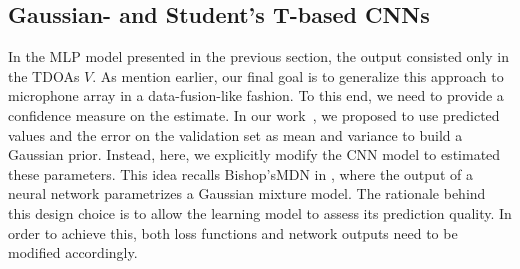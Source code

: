 \subsection{Gaussian- and Student's T-based CNNs}
In the \ac{MLP} model presented in the previous section, the output consisted only in the \acp{TDOA} $V$.
As mention earlier, our final goal is to generalize this approach to microphone array in a data-fusion-like fashion.
To this end, we need to provide a confidence measure on the estimate.
In our work~, we proposed to use predicted values and the error on the validation set as mean and variance to build a Gaussian prior.
Instead, here, we explicitly modify the \ac{CNN} model to estimated these parameters.
This idea recalls Bishop's\ac{MDN} in , where the output of a neural network parametrizes a Gaussian mixture model.
The rationale behind this design choice is to allow the learning model to assess its prediction quality.
In order to achieve this, both loss functions and network outputs need to be modified accordingly.
\newcommand{\xiTheta}{{\xi;\theta}}
\newcommand{\sigmaTauv}{\ensuremath{\sigma^2_{v}(\xiTheta)}}
\newcommand{\muTauv}{\ensuremath{\mu_{v}(\xiTheta)}}
\newcommand{\sigmaTau}{\ensuremath{\sigma^2_{v}}}
\newcommand{\muTau}{\ensuremath{\mu_{v}}}
\newcommand{\estSigmaTau}{\ensuremath{\sigma^2_{v}}}
\newcommand{\estMuTau}{\ensuremath{\mu_{v}}}

